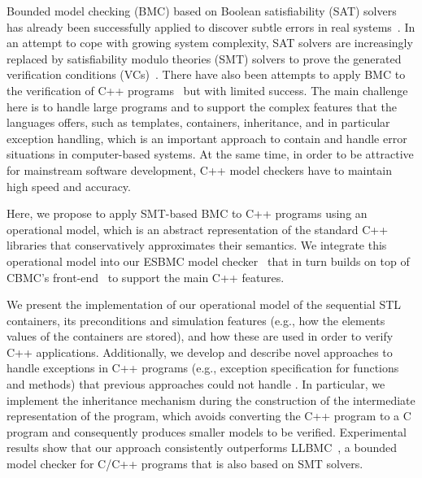 \documentclass[conference]{IEEEtran}
\begin{document}
Bounded model checking (BMC) based on Boolean satisfiability (SAT) solvers
has already been successfully applied to discover
subtle errors in real systems~\cite{handbook09}. In an attempt to cope
with growing system complexity, SAT solvers are increasingly
replaced by satisfiability modulo theories (SMT) solvers to prove the generated
verification conditions (VCs)~\cite{Armando09,Cordeiro12,Ganai06}.
There have also been attempts to apply BMC to the verification of C++
programs~\cite{Florian12,Yang12} but with limited success. The main challenge
here is to handle large programs and to support the complex features that the
languages offers, such as templates, containers, inheritance, and in particular exception handling,
which is an important approach to contain and handle error situations
in computer-based systems. At the same time, in order to be attractive for
mainstream software development, C++ model checkers have to maintain high speed and accuracy.

Here, we propose to apply SMT-based BMC to C++ programs using an operational model, which
is an abstract representation of the standard C++ libraries that
conservatively approximates their semantics. We integrate this operational model
into our ESBMC model checker~\cite{Cordeiro12} that in turn builds on top
of CBMC's front-end~\cite{Clarke04} to support the main C++ features.

We present the implementation of our operational model of the sequential STL
containers, its preconditions and simulation features (e.g., how the
elements values of the containers are stored), and how these are used in order to verify
C++ applications.  Additionally, we develop and describe novel approaches to handle
exceptions in C++ programs (e.g., exception specification for
functions and methods) that previous approaches could not handle
\cite{Blanc07,Florian12,PrabhuMBIG11}. In particular, we implement the
inheritance mechanism during the construction of the intermediate
representation of the program, which avoids converting the C++ program
to a C program and consequently produces smaller models to be verified.
Experimental results show that our approach consistently outperforms
LLBMC~\cite{Florian12}, a bounded model checker for C/C++ programs that is
also based on SMT solvers.
\end{document}
